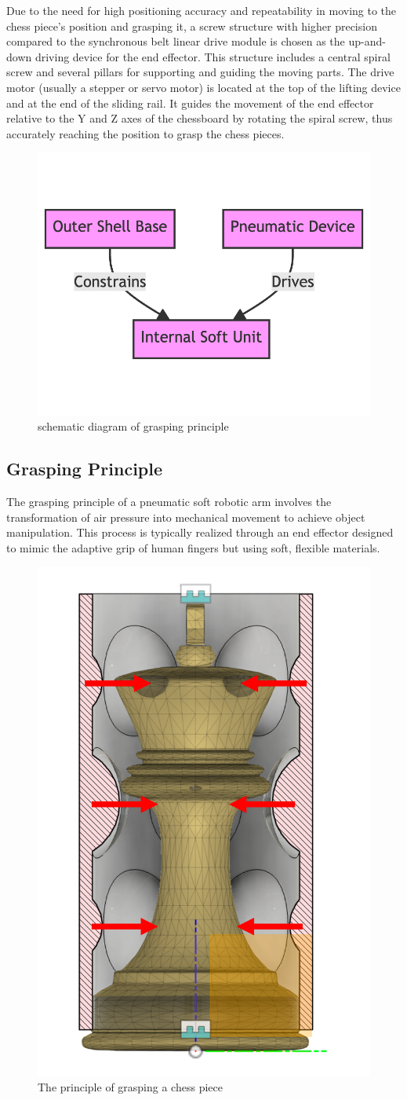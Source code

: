 \documentclass[10pt, a4paper, twocolumn]{article}
\begin{document}
Due to the need for high positioning accuracy and repeatability in moving to the chess piece's position and grasping it, a screw structure with higher precision compared to the synchronous belt linear drive module is chosen as the up-and-down driving device for the end effector. This structure includes a central spiral screw and several pillars for supporting and guiding the moving parts. The drive motor (usually a stepper or servo motor) is located at the top of the lifting device and at the end of the sliding rail. It guides the movement of the end effector relative to the Y and Z axes of the chessboard by rotating the spiral screw, thus accurately reaching the position to grasp the chess pieces.

\begin{figure}
    \centering
    \includegraphics[width=0.6\linewidth]{grasping principle.png}
    \caption{schematic diagram of grasping principle}
    \label{fig:grasping principle}
\end{figure}

\subsection{Grasping Principle}
The grasping principle of a pneumatic soft robotic arm involves the transformation of air pressure into mechanical movement to achieve object manipulation. This process is typically realized through an end effector designed to mimic the adaptive grip of human fingers but using soft, flexible materials.

\begin{figure}
\centering
\includegraphics[width=0.3\linewidth]{grasping chess.png}
\caption{The principle of grasping a chess piece}
\label{fig:grasping_chess}
\end{figure}
\end{document}
